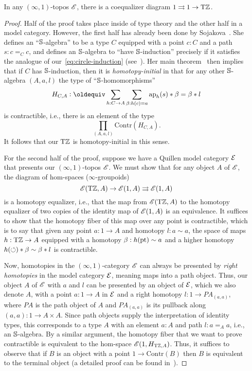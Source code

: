 \documentclass[a4paper,12pt]{amsart}
\begin{document}
\begin{theorem}\label{thm:torz-coeq}
  In any $(\infty,1)$-topos $\mathscr{E}$, there is a coequalizer diagram $1 \rightrightarrows 1 \to {\mathrm{T}\mathbb{Z}}$.
\end{theorem}
\begin{proof}
  Half of the proof takes place inside of type theory and the other half in a model category.
However, the first half has already been done by Sojakova~\cite{sojakova:hits-hias}.
She defines an ``$\mathbb{S}$-algebra'' to be a type $C$ equipped with a point $c:C$ and a path $s:c=_C c$, and defines an $\mathbb{S}$-algebra to ``have $\mathbb{S}$-induction'' precisely if it satisfies the analogue of our~\eqref{eq:circle-induction} (see~\cite[Notation 22]{sojakova:hits-hias}).
Her main theorem~\cite[Theorem 50]{sojakova:hits-hias} then implies that if $C$ has $\mathbb{S}$-induction, then it is \emph{homotopy-initial} in that for any other $\mathbb{S}$-algebra $(A,a,l)$ the type of ``$\mathbb{S}$-homomorphisms''
\[H_{C,A} \defeq \sum_{h:C\to A} \sum_{\beta: h(c) = a} \ap{h}(s) \ct \beta = \beta \ct l  \]
is contractible, i.e., there is an element of the type
\[ \prod_{(A,a,l)} \mathrm{Contr}(H_{C,A}). \]
It follows that our ${\mathrm{T}\mathbb{Z}}$ is homotopy-initial in this sense.

For the second half of the proof, suppose we have a Quillen model category $\mathcal{E}$ that presents our $(\infty,1)$-topos $\mathscr{E}$.
We must show that for any object $A$ of $\mathscr{E}$, the diagram of hom-spaces ($\infty$-groupoids)
\[ \mathscr{E}({\mathrm{T}\mathbb{Z}},A) \to \mathscr{E}(1,A) \rightrightarrows \mathscr{E}(1,A) \]
is a homotopy equalizer, i.e., that the map from $\mathscr{E}({\mathrm{T}\mathbb{Z}},A)$ to the homotopy equalizer of two copies of the identity map of $\mathscr{E}(1,A)$ is an equivalence.
It suffices to show that the homotopy fiber of this map over any point is contractible, which is to say that given any point $a:1\to A$ and homotopy $l:a\sim a$, the space of maps $h:{\mathrm{T}\mathbb{Z}}\to A$ equipped with a homotopy $\beta : h({\mathord{\mathrm{pt}}}) \sim a$ and a higher homotopy $h({\circlearrowleft}) * \beta \sim \beta * l$ is contractible.

Now, homotopies in the $(\infty,1)$-category $\mathscr{E}$ can always be presented by \emph{right homotopies} in the model category $\mathcal{E}$, meaning maps into a path object.
Thus, our object $A$ of $\mathscr{E}$ with $a$ and $l$ can be presented by an object of $\mathcal{E}$, which we also denote $A$, with a point $a:1\to A$ in $\mathcal{E}$ and a right homotopy $l:1\to P A_{(a,a)}$, where $P A$ is the path object of $A$ and $P A_{(a,a)}$ is its pullback along $(a,a):1\to A\times A$.
Since path objects supply the interpretation of identity types, this corresponds to a type $A$ with an element $a:A$ and path $l:a=_A a$, i.e., an $\mathbb{S}$-algebra.
By a similar argument, the homotopy fiber that we want to prove contractible is equivalent to the hom-space $\mathscr{E}(1, H_{{\mathrm{T}\mathbb{Z}},A})$.
Thus, it suffices to observe that if $B$ is an object with a point $1\to \mathrm{Contr}(B)$ then $B$ is equivalent to the terminal object (a detailed proof can be found in~\cite[Lemma 4.1]{shulman:elreedy}).
\end{proof}
\end{document}

